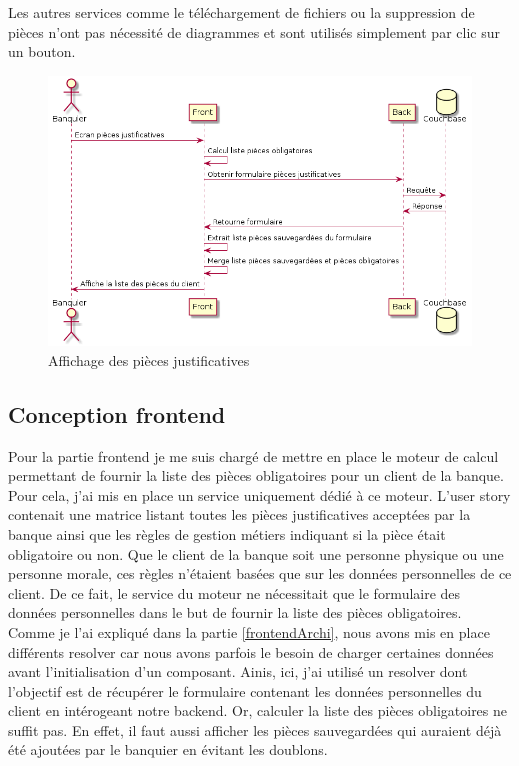 	Les autres services comme le téléchargement de fichiers ou la suppression de pièces n'ont pas nécessité de diagrammes et sont utilisés simplement par clic sur un bouton. \\

\begin{figure}[h!]
	\includegraphics[scale=0.55]{images/travailBP1818/piecesJustif/seqGet.png}
	\centering
	\caption{Affichage des pièces justificatives}
	\label{seqGet}
\end{figure}

\subsection{Conception frontend}
	
	Pour la partie frontend je me suis chargé de mettre en place le moteur de calcul permettant de fournir la liste des pièces obligatoires pour un client de la banque. Pour cela, j'ai mis en place un service uniquement dédié à ce moteur. L'user story contenait une matrice listant toutes les pièces justificatives acceptées par la banque ainsi que les règles de gestion métiers indiquant si la pièce était obligatoire ou non. Que le client de la banque soit une personne physique ou une personne morale, ces règles n'étaient basées que sur les données personnelles de ce client. De ce fait, le service du moteur ne nécessitait que le formulaire des données personnelles dans le but de fournir la liste des pièces obligatoires. \\
	
	Comme je l'ai expliqué dans la partie \ref{frontendArchi}, nous avons mis en place différents resolver car nous avons parfois le besoin de charger certaines données avant l'initialisation d'un composant. Ainis, ici, j'ai utilisé un resolver dont l'objectif est de récupérer le formulaire contenant les données personnelles du client en intérogeant notre backend. Or, calculer la liste des pièces obligatoires ne suffit pas. En effet, il faut aussi afficher les pièces sauvegardées qui auraient déjà été ajoutées par le banquier en évitant les doublons. \\
	
